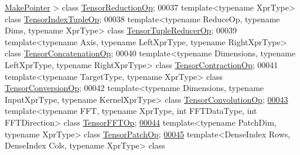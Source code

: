 \begin{DoxyCode}
      \hyperlink{struct_eigen_1_1_make_pointer}{MakePointer} > \textcolor{keyword}{class }\hyperlink{class_eigen_1_1_tensor_reduction_op}{TensorReductionOp};
00037 \textcolor{keyword}{template}<\textcolor{keyword}{typename} XprType> \textcolor{keyword}{class }\hyperlink{class_eigen_1_1_tensor_index_tuple_op}{TensorIndexTupleOp};
00038 \textcolor{keyword}{template}<\textcolor{keyword}{typename} ReduceOp, \textcolor{keyword}{typename} Dims, \textcolor{keyword}{typename} XprType> \textcolor{keyword}{class }
      \hyperlink{class_eigen_1_1_tensor_tuple_reducer_op}{TensorTupleReducerOp};
00039 \textcolor{keyword}{template}<\textcolor{keyword}{typename} Axis, \textcolor{keyword}{typename} LeftXprType, \textcolor{keyword}{typename} RightXprType> \textcolor{keyword}{class }
      \hyperlink{class_eigen_1_1_tensor_concatenation_op}{TensorConcatenationOp};
00040 \textcolor{keyword}{template}<\textcolor{keyword}{typename} Dimensions, \textcolor{keyword}{typename} LeftXprType, \textcolor{keyword}{typename} RightXprType> \textcolor{keyword}{class }
      \hyperlink{class_eigen_1_1_tensor_contraction_op}{TensorContractionOp};
00041 \textcolor{keyword}{template}<\textcolor{keyword}{typename} TargetType, \textcolor{keyword}{typename} XprType> \textcolor{keyword}{class }\hyperlink{class_eigen_1_1_tensor_conversion_op}{TensorConversionOp};
00042 \textcolor{keyword}{template}<\textcolor{keyword}{typename} Dimensions, \textcolor{keyword}{typename} InputXprType, \textcolor{keyword}{typename} KernelXprType> \textcolor{keyword}{class }
      \hyperlink{class_eigen_1_1_tensor_convolution_op}{TensorConvolutionOp};
\hyperlink{class_eigen_1_1_tensor_f_f_t_op}{00043} \textcolor{keyword}{template}<\textcolor{keyword}{typename} FFT, \textcolor{keyword}{typename} XprType, \textcolor{keywordtype}{int} FFTDataType, \textcolor{keywordtype}{int} FFTDirection> \textcolor{keyword}{class }
      \hyperlink{class_eigen_1_1_tensor_f_f_t_op}{TensorFFTOp};
\hyperlink{class_eigen_1_1_tensor_patch_op}{00044} \textcolor{keyword}{template}<\textcolor{keyword}{typename} PatchDim, \textcolor{keyword}{typename} XprType> \textcolor{keyword}{class }\hyperlink{class_eigen_1_1_tensor_patch_op}{TensorPatchOp};
\hyperlink{class_eigen_1_1_tensor_image_patch_op}{00045} \textcolor{keyword}{template}<DenseIndex Rows, DenseIndex Cols, \textcolor{keyword}{typename} XprType> \textcolor{keyword}{class }

\end{DoxyCode}

